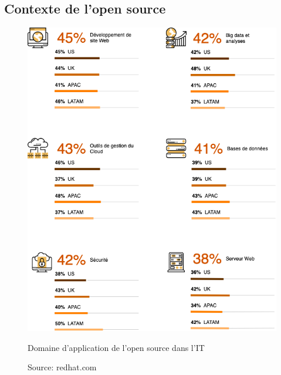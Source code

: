 \begin{appendices}

\chapter{Contexte de l'open source}

\begin{figure}[h]
	\center
	\includegraphics[scale=0.65]{./img/Domain_os.png}
	\caption{Domaine d'application de l'open source dans l'IT}							
	\caption*{\color{silver}Source: redhat.com}					
\end{figure}


\end{appendices}
